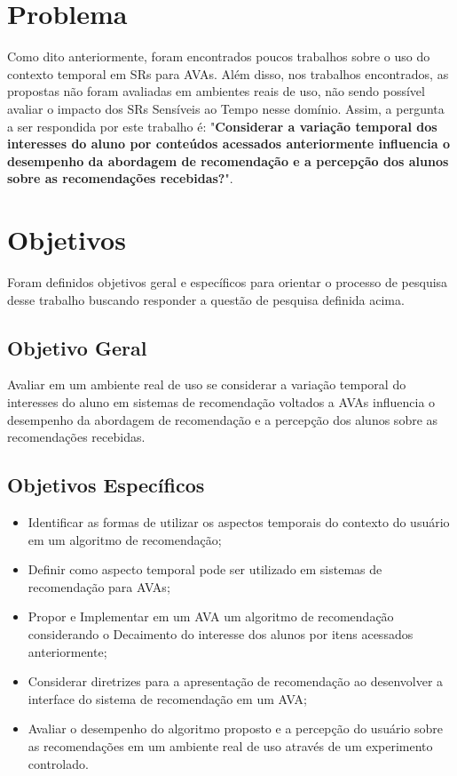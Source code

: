 \section{Problema}

Como dito anteriormente, foram encontrados poucos trabalhos sobre o uso do contexto temporal em SRs para AVAs. Além disso,
nos trabalhos encontrados, as propostas não foram avaliadas em ambientes reais de uso, não sendo possível avaliar o
impacto dos SRs Sensíveis ao Tempo nesse domínio. Assim, a pergunta a ser respondida por este trabalho
é: "\textbf{Considerar a variação temporal dos interesses do aluno por conteúdos acessados anteriormente influencia o desempenho
da abordagem de recomendação e a percepção dos alunos sobre as recomendações recebidas?}".

\section{Objetivos}

Foram definidos objetivos geral e específicos para orientar o processo de pesquisa desse trabalho buscando responder a questão
de pesquisa definida acima.

\subsection{Objetivo Geral}

Avaliar em um ambiente real de uso se considerar a variação temporal do interesses do aluno em sistemas de recomendação
voltados a AVAs influencia o desempenho da abordagem de recomendação e a percepção dos alunos sobre as recomendações recebidas.

\subsection{Objetivos Específicos}

\begin{itemize}
\item Identificar as formas de utilizar os aspectos temporais do contexto do usuário em um algoritmo de recomendação;
\item Definir como aspecto temporal pode ser utilizado em sistemas de recomendação para AVAs;
\item Propor e Implementar em um AVA um algoritmo de recomendação considerando o Decaimento do interesse dos alunos por itens
acessados anteriormente;
\item Considerar diretrizes para a apresentação de recomendação ao desenvolver a interface do sistema de recomendação
em um AVA;
\item Avaliar o desempenho do algoritmo proposto e a percepção do usuário sobre as recomendações em um ambiente real de uso
através de um experimento controlado.
\end{itemize}


